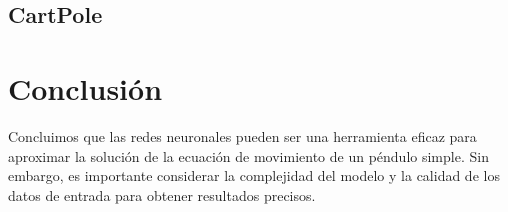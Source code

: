 \documentclass[a4paper,12pt]{article}
\begin{document}
\subsection*{CartPole}


\section{Conclusión}
Concluimos que las redes neuronales pueden ser una herramienta eficaz para aproximar la solución de la ecuación de movimiento de un péndulo simple. Sin embargo, es importante considerar la complejidad del modelo y la calidad de los datos de entrada para obtener resultados precisos.
\end{document}
